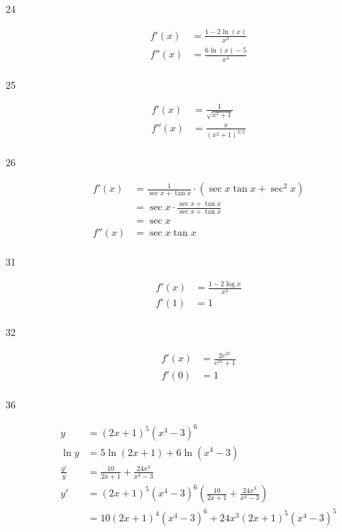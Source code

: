 \documentclass[letterpaper, landscape]{exam}
\begin{document}
\begin{description}
    \item[24] 
      \begin{align*}
        f'(x)  & = \boxed{ \frac{1 - 2 \ln (x)}{x^3} } \\
        f''(x) & = \boxed{ \frac{6 \ln (x) - 5}{x^4} } \\
      \end{align*}

    \item[25] 
      \begin{align*}
        f'(x)  & = \boxed{ \frac{1}{\sqrt{x^2 + 1}} } \\
        f''(x) & = \boxed{ \frac{x}{ \left( x^2 + 1 \right)^{3/2} } } \\
      \end{align*}

    \item[26] 
      \begin{align*}
        f'(x)  & = \frac{1}{\sec x + \tan x} \cdot (\sec x \tan x + \sec^2 x) \\
               & = \sec x \cdot \frac{\sec x + \tan x}{\sec x + \tan x} \\
               & = \boxed{ \sec x } \\
        f''(x) & = \boxed{ \sec x \tan x } \\
      \end{align*}
      
    \item[31] 
      \begin{align*}
        f'(x) & = \frac{1 - 2 \log x}{x^3} \\
        f'(1) & = \boxed{ 1 } \\
      \end{align*}

    \item[32] 
      \begin{align*}
        f'(x) & = \frac{2 e^{2x}}{e^{2x} + 1} \\
        f'(0) & = \boxed{ 1 } \\
      \end{align*}

    \item[36] 
      \begin{align*}
        y            & = (2x + 1)^5 \left( x^4 - 3 \right)^6 \\
        \ln y        & = 5 \ln (2x + 1) + 6 \ln \left( x^4 - 3 \right) \\
        \frac{y'}{y} & = \frac{10}{2x + 1} + \frac{24x^3}{x^4 - 3} \\
        y'           & = (2x + 1)^5 \left(x^4 - 3\right)^6 \left( \frac{10}{2x + 1} + \frac{24x^3}{x^4 - 3} \right) \\
                     & = \boxed{ 10 (2x + 1)^4 \left( x^4 - 3 \right)^6 + 24x^3 (2x + 1)^5 \left( x^4 - 3 \right)^5 } \\
      \end{align*}
      

\end{description}
\end{document}
